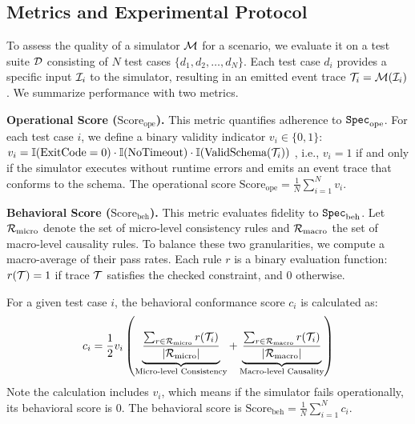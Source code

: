 
\subsection{Metrics and Experimental Protocol}
\label{sec:metrics}

To assess the quality of a simulator $\mathcal{M}$ for a scenario, we evaluate it on a test suite $\mathcal{D}$ consisting of $N$ test cases $\{d_1, d_2, \dots, d_N\}$. Each test case $d_i$ provides a specific input $\mathcal{I}_i$ to the simulator, resulting in an emitted event trace $\mathcal{T}_i = \mathcal{M}(\mathcal{I}_i)$. We summarize performance with two metrics.

\noindent\textbf{Operational Score ($\mathrm{Score}_{\mathrm{ope}}$).}
This metric quantifies adherence to ${\texttt{Spec}}_{\mathrm{ope}}$. For each test case $i$, we define a binary validity indicator $v_i \in \{0, 1\}$:
$v_i = \mathbb{I}(\text{ExitCode}=0) \cdot \mathbb{I}(\text{NoTimeout}) \cdot \mathbb{I}(\text{ValidSchema}(\mathcal{T}_i))$
, i.e., $v_i = 1$ if and only if the simulator executes without runtime errors and emits an event trace that conforms to the schema. The operational score $\text{Score}_{\mathrm{ope}} = \frac{1}{N} \sum_{i=1}^{N} v_i$.

\noindent\textbf{Behavioral Score ($\mathrm{Score}_{\mathrm{beh}}$).}
This metric evaluates fidelity to ${\texttt{Spec}}_{\mathrm{beh}}$. Let $\mathcal{R}_{\mathrm{micro}}$ denote the set of micro-level consistency rules and $\mathcal{R}_{\mathrm{macro}}$ the set of macro-level causality rules. To balance these two granularities, we compute a macro-average of their pass rates. Each rule $r$ is a binary evaluation function: $r(\mathcal{T})=1$ if trace $\mathcal{T}$ satisfies the checked constraint, and 0 otherwise.

For a given test case $i$, the behavioral conformance score $c_i$ is calculated as:
\begin{equation}
    c_i = 
    \frac{1}{2} v_i \left( \underbrace{\frac{\sum_{r \in \mathcal{R}_{\mathrm{micro}}} r(\mathcal{T}_i)}{|\mathcal{R}_{\mathrm{micro}}|}}_{\text{Micro-level Consistency}} + \underbrace{\frac{\sum_{r \in \mathcal{R}_{\mathrm{macro}}} r(\mathcal{T}_i)}{|\mathcal{R}_{\mathrm{macro}}|}}_{\text{Macro-level Causality}} \right)
\end{equation}
Note the calculation includes $v_i$, which means if the simulator fails operationally, its behavioral score is 0. The behavioral score is $\text{Score}_{\mathrm{beh}} = \frac{1}{N} \sum_{i=1}^{N} c_i$.
